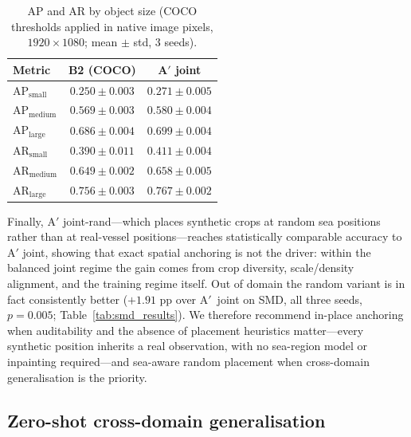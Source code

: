 \documentclass[10pt,conference]{IEEEtran}
\begin{document}
\begin{table}[!t]
\renewcommand{\arraystretch}{1.05}
\caption{AP and AR by object size (COCO thresholds applied in native image
pixels, $1920\times1080$; mean $\pm$ std, 3 seeds).}
\label{tab:size}
\centering
\footnotesize
\setlength{\tabcolsep}{5pt}
\begin{tabular}{@{}lcc@{}}
\toprule
Metric & B2 (COCO) & A$'$ joint \\
\midrule
$\text{AP}_\text{small}$  & $0.250 \pm 0.003$ & $0.271 \pm 0.005$ \\
$\text{AP}_\text{medium}$ & $0.569 \pm 0.003$ & $0.580 \pm 0.004$ \\
$\text{AP}_\text{large}$  & $0.686 \pm 0.004$ & $0.699 \pm 0.004$ \\
$\text{AR}_\text{small}$  & $0.390 \pm 0.011$ & $0.411 \pm 0.004$ \\
$\text{AR}_\text{medium}$ & $0.649 \pm 0.002$ & $0.658 \pm 0.005$ \\
$\text{AR}_\text{large}$  & $0.756 \pm 0.003$ & $0.767 \pm 0.002$ \\
\bottomrule
\end{tabular}
\end{table}

Finally, A$'$ joint-rand---which places synthetic crops at random sea positions
rather than at real-vessel positions---reaches statistically comparable accuracy
to A$'$ joint, showing that exact spatial anchoring is not the driver: within the
balanced joint regime the gain comes from crop diversity, scale/density
alignment, and the training regime itself. Out of domain the random variant is in
fact consistently better ($+1.91$ pp over A$'$~joint on SMD, all three seeds,
$p=0.005$; Table~\ref{tab:smd_results}). We therefore recommend in-place
anchoring when auditability and the absence of placement heuristics matter---every
synthetic position inherits a real observation, with no sea-region model or
inpainting required---and sea-aware random placement when cross-domain
generalisation is the priority.

\subsection{Zero-shot cross-domain generalisation}
\label{subsec:zeroshot}
\end{document}
